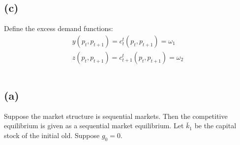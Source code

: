 \documentclass{ltjsarticle}
\begin{document}
\subsection*{(c)}
Define the excess demand functions:
\begin{align*}
  y(p_t, p_{t+1}) = c_t^t(p_t, p_{t+1}) = \omega_1\\
  z(p_t, p_{t+1}) = c_{t+1}^t(p_t, p_{t+1}) = \omega_2\\
\end{align*}

\section{} %

\section{} %

\subsection*{(a)}

Suppose the market structure is sequential markets. Then the competitive equilibrium is given as a sequential market equilibrium.
Let $\bar{k}_1$ be the capital stock of the initial old. Suppose $g_0 = 0$.
\end{document}
